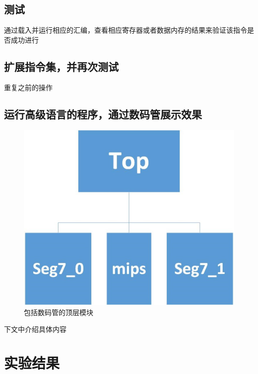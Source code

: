 \documentclass[UTF8]{article}
\begin{document}
\subsection{测试}
通过载入并运行相应的汇编，查看相应寄存器或者数据内存的结果来验证该指令是否成功进行

\subsection{扩展指令集，并再次测试}
重复之前的操作

\subsection{运行高级语言的程序，通过数码管展示效果}

\begin{figure}[H]
    \centering
    \includegraphics[width=\linewidth]{9.jpg}
    \caption{包括数码管的顶层模块}
    \label{FIG8}
\end{figure}

下文中介绍具体内容

\section{实验结果}
\end{document}
